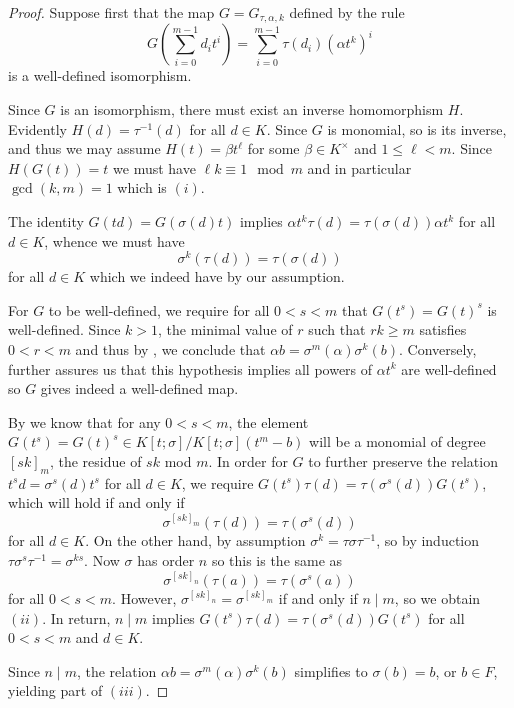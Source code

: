 \documentclass{amsart}
\theoremstyle{plain}
\theoremstyle{definition}
\numberwithin{equation}{section}
\numberwithin{figure}{section}
\begin{document}
\begin{proof}
 Suppose first that the map $G=G_{\tau,\alpha,k}$ defined by the rule
\begin{equation}\label{E:formulaG(t)}
G( \sum_{i=0}^{m-1}d_it^i ) = \sum_{i=0}^{m-1}\tau(d_i) (\alpha t^k)^i
\end{equation}
is a well-defined isomorphism.

Since $G$ is an isomorphism, there must exist an inverse homomorphism $H$.
Evidently $H(d)=\tau^{-1}(d)$ for all $d\in K$.  Since $G$ is monomial, so is its inverse, and thus we may assume $H(t)=\beta t^\ell$ for some $\beta \in K^\times$ and $1\leq \ell < m$.  Since $H(G(t))=t$ we must have $\ell k \equiv 1 \mod m$ and in particular $\gcd(k,m)=1$ which is $(i)$.


The identity $G(td)=G(\sigma(d)t)$ implies $\alpha t^k \tau(d) = \tau(\sigma(d)) \alpha t^k$ for all $d\in K$, whence we must have
$$ \sigma^k(\tau(d)) = \tau(\sigma(d))$$ for all $d\in K$ which we indeed have by our assumption.


For $G$ to be well-defined, we require for all $0<s <m$ that $G(t^s)=G(t)^s$ is well-defined.  Since $k>1$, the minimal value of $r$ such that $rk\geq m$ satisfies $0<r<m$ and thus by \cite[Theorem 3.3]{NevPum2025}, we conclude that $\alpha b = \sigma^{m}(\alpha)\sigma^k(b)$.
Conversely, \cite[Theorem 3.3]{NevPum2025} further assures us that this hypothesis implies all powers of $\alpha t^k$ are well-defined so $G$ gives indeed a well-defined map.

 By  \cite[Theorem 3.3]{NevPum2025} we know  that for any $0<s<m$, the element $G(t^s)=G(t)^s \in K[t;\sigma]/K[t;\sigma](t^m-b)$ will be a monomial of degree $[sk]_{m}$, the residue of $sk$ mod $m$. In order for $G$ to further preserve the relation $t^sd=\sigma^s(d)t^s$ for all $d\in K$, we require $G(t^s)\tau(d) = \tau(\sigma^s(d))G(t^s)$, which will hold if and only if
$$
\sigma^{[sk]_{m}}(\tau(d))=\tau(\sigma^{s}(d))
$$
for all $d\in K$. On the other hand, by assumption $ \sigma^k = \tau\sigma\tau^{-1}$, so
 by induction
$ \tau\sigma^s \tau^{-1}=\sigma^{ks}$. Now $\sigma$ has order $n$ so this is the same as
$$
\sigma^{[sk]_{n}}(\tau(a))=\tau(\sigma^{s}(a))
$$
for all $0<s<m$. However, $\sigma^{[sk]_{n}}=
\sigma^{[sk]_{m}}$ if and only if $n\mid m$, so we obtain $(ii)$. In return, $n\mid m$ implies $G(t^s)\tau(d) = \tau(\sigma^s(d))G(t^s)$ for all $0<s<m$ and $d\in K$.


Since $n\mid m$, the relation $\alpha b = \sigma^{m}(\alpha)\sigma^k(b)$ simplifies to $\sigma(b)=b$, or $b\in F$, yielding part of $(iii)$.



\end{proof}
\end{document}
